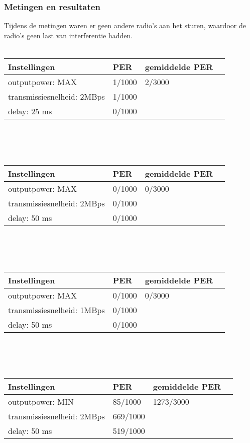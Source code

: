 \documentclass{article}
\begin{document}
\subsubsection{Metingen en resultaten}
Tijdens de metingen waren er geen andere radio's aan het sturen, waardoor de radio's geen last van interferentie hadden.\\
\\
    \begin{tabular}{ | l | l | l | p{5cm} |}
    \hline
    Instellingen 				& PER 		& gemiddelde PER\\ \hline
    outputpower: MAX 			& 1/1000 	& 2/3000		\\
    transmissiesnelheid: 2MBps 	& 1/1000 	& 				\\
    delay: 25 ms 				& 0/1000	&  				\\ \hline
    \end{tabular}\\
\\
\\
    \begin{tabular}{ | l | l | l | p{5cm} |}
    \hline
    Instellingen				& PER 		& gemiddelde PER\\ \hline
    outputpower: MAX 			& 0/1000 	& 0/3000		\\
    transmissiesnelheid: 2MBps 	& 0/1000 	&  				\\
    delay: 50 ms 				& 0/1000	&  				\\ \hline
    \end{tabular}\\
\\
\\
    \begin{tabular}{ | l | l | l | p{5cm} |}
    \hline
    Instellingen 				& PER 		& gemiddelde PER\\ \hline
    outputpower: MAX 			& 0/1000 	& 0/3000		\\
    transmissiesnelheid: 1MBps 	& 0/1000 	&  				\\
    delay: 50 ms 				& 0/1000	&  				\\ \hline
    \end{tabular}\\
\\
\\
    \begin{tabular}{ | l | l | l | p{5cm} |}
    \hline
    Instellingen				& PER 		& gemiddelde PER\\ \hline
    outputpower: MIN 			& 85/1000 	& 1273/3000		\\ 
    transmissiesnelheid: 2MBps 	& 669/1000  &  				\\ 
    delay: 50 ms 				& 519/1000 	&  				\\ \hline
    \end{tabular}\\
\end{document}
